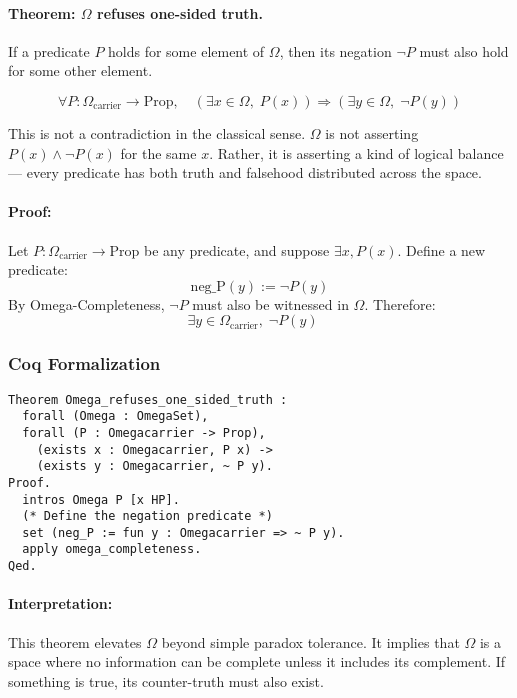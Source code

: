 \documentclass[12pt]{article}
\begin{document}
\paragraph{Theorem: \( \Omega \) refuses one-sided truth.}  
If a predicate \( P \) holds for some element of \( \Omega \), then its negation \( \neg P \) must also hold for some other element.

\begin{equation}
    \forall P: \Omega_{\text{carrier}} \to \text{Prop}, \quad
    \left( \exists x \in \Omega, \; P(x) \right) \Rightarrow
    \left( \exists y \in \Omega, \; \neg P(y) \right)
\end{equation}

This is not a contradiction in the classical sense. \( \Omega \) is not asserting \( P(x) \land \neg P(x) \) for the same \( x \). Rather, it is asserting a kind of logical balance — every predicate has both truth and falsehood distributed across the space.

\paragraph{Proof:}
Let \( P : \Omega_{\text{carrier}} \to \text{Prop} \) be any predicate, and suppose \( \exists x, P(x) \). Define a new predicate:
\[
\text{neg\_P}(y) := \neg P(y)
\]
By Omega-Completeness, \( \neg P \) must also be witnessed in \( \Omega \). Therefore:
\[
\exists y \in \Omega_{\text{carrier}}, \; \neg P(y)
\quad
\]

\subsubsection*{Coq Formalization}
\begin{lstlisting}[language=Coq]
Theorem Omega_refuses_one_sided_truth :
  forall (Omega : OmegaSet),
  forall (P : Omegacarrier -> Prop),
    (exists x : Omegacarrier, P x) ->
    (exists y : Omegacarrier, ~ P y).
Proof.
  intros Omega P [x HP].
  (* Define the negation predicate *)
  set (neg_P := fun y : Omegacarrier => ~ P y).
  apply omega_completeness.
Qed.
\end{lstlisting}

\paragraph{Interpretation:}
This theorem elevates \( \Omega \) beyond simple paradox tolerance. It implies that \( \Omega \) is a space where no information can be complete unless it includes its complement. If something is true, its counter-truth must also exist.
\end{document}
